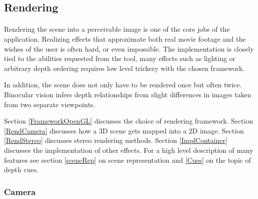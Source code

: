 \subsection{Rendering}
\paragraph{}
Rendering the scene into a perceivable image is one of the core jobs of the application.
Realizing effects that approximate both real movie footage and the wishes of the user is often hard, or even impossible.
The implementation is closely tied to the abilities requested from the tool, many effects such as lighting or arbitrary depth ordering requires low level trickery with the chosen framework.

In addition, the scene does not only have to be rendered once but often twice.
Binocular vision infers depth relationships from slight differences in images taken from two separate viewpoints.

Section \ref{FrameworkOpenGL} discusses the choice of rendering framework.
Section \ref{RendCamera} discusses how a 3D scene gets mapped into a 2D image.
Section \ref{RendStereo} discusses stereo rendering methods.
Section \ref{ImplContainer} discusses the implementation of other effects.
For a high level description of many features see section \ref{sceneRep} on scene representation and \ref{Cues} on the topic of depth cues.


\subsubsection{Camera\label{RendCamera}}


